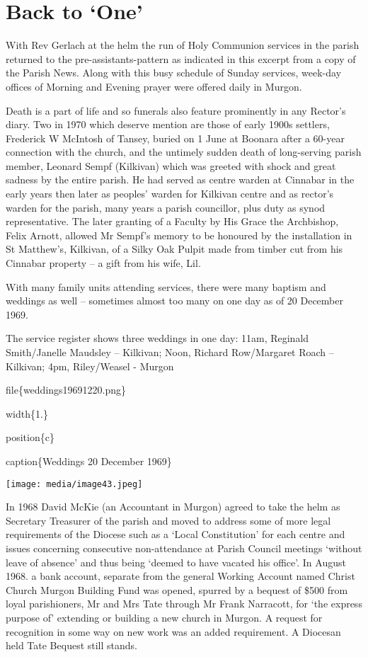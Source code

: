 \hypertarget{back-to-one}{%
\section{Back to `One'}\label{back-to-one}}

With Rev Gerlach at the helm the run of Holy Communion services in the parish returned to the pre-assistants-pattern as indicated in this excerpt from a copy of the Parish News. Along with this busy schedule of Sunday services, week-day offices of Morning and Evening prayer were offered daily in Murgon.

Death is a part of life and so funerals also feature prominently in any Rector's diary. Two in 1970 which deserve mention are those of early 1900s settlers, Frederick W McIntosh of Tansey, buried on 1 June at Boonara after a 60-year connection with the church, and the untimely sudden death of long-serving parish member, Leonard Sempf (Kilkivan) which was greeted with shock and great sadness by the entire parish. He had served as centre warden at Cinnabar in the early years then later as peoples' warden for Kilkivan centre and as rector's warden for the parish, many years a parish councillor, plus duty as synod representative. The later granting of a Faculty by His Grace the Archbishop, Felix Arnott, allowed Mr Sempf's memory to be honoured by the installation in St Matthew's, Kilkivan, of a Silky Oak Pulpit made from timber cut from his Cinnabar property -- a gift from his wife, Lil.

With many family units attending services, there were many baptism and weddings as well -- sometimes almost too many on one day as of 20 December 1969.

The service register shows three weddings in one day: 11am, Reginald Smith/Janelle Maudsley -- Kilkivan; Noon, Richard Row/Margaret Roach -- Kilkivan; 4pm, Riley/Weasel - Murgon

file\{weddings19691220.png\}

width\{1.\}

position\{c\}

caption\{Weddings 20 December 1969\}

\texttt{[image: media/image43.jpeg]}

In 1968 David McKie (an Accountant in Murgon) agreed to take the helm as Secretary Treasurer of the parish and moved to address some of more legal requirements of the Diocese such as a `Local Constitution' for each centre and issues concerning consecutive non-attendance at Parish Council meetings `without leave of absence' and thus being `deemed to have vacated his office'. In August 1968. a bank account, separate from the general Working Account named Christ Church Murgon Building Fund was opened, spurred by a bequest of \$500 from loyal parishioners, Mr and Mrs Tate through Mr Frank Narracott, for `the express purpose of' extending or building a new church in Murgon. A request for recognition in some way on new work was an added requirement. A Diocesan held Tate Bequest still stands.

